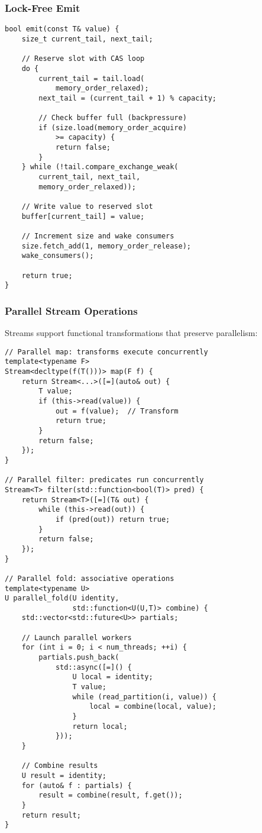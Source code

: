 \documentclass[sigconf,review,anonymous]{acmart}
\begin{document}
\subsubsection{Lock-Free Emit}

\begin{lstlisting}
bool emit(const T& value) {
    size_t current_tail, next_tail;
    
    // Reserve slot with CAS loop
    do {
        current_tail = tail.load(
            memory_order_relaxed);
        next_tail = (current_tail + 1) % capacity;
        
        // Check buffer full (backpressure)
        if (size.load(memory_order_acquire) 
            >= capacity) {
            return false;
        }
    } while (!tail.compare_exchange_weak(
        current_tail, next_tail,
        memory_order_relaxed));
    
    // Write value to reserved slot
    buffer[current_tail] = value;
    
    // Increment size and wake consumers
    size.fetch_add(1, memory_order_release);
    wake_consumers();
    
    return true;
}
\end{lstlisting}

\subsubsection{Parallel Stream Operations}

Streams support functional transformations that preserve parallelism:

\begin{lstlisting}
// Parallel map: transforms execute concurrently
template<typename F>
Stream<decltype(f(T()))> map(F f) {
    return Stream<...>([=](auto& out) {
        T value;
        if (this->read(value)) {
            out = f(value);  // Transform
            return true;
        }
        return false;
    });
}

// Parallel filter: predicates run concurrently
Stream<T> filter(std::function<bool(T)> pred) {
    return Stream<T>([=](T& out) {
        while (this->read(out)) {
            if (pred(out)) return true;
        }
        return false;
    });
}

// Parallel fold: associative operations
template<typename U>
U parallel_fold(U identity, 
                std::function<U(U,T)> combine) {
    std::vector<std::future<U>> partials;
    
    // Launch parallel workers
    for (int i = 0; i < num_threads; ++i) {
        partials.push_back(
            std::async([=]() {
                U local = identity;
                T value;
                while (read_partition(i, value)) {
                    local = combine(local, value);
                }
                return local;
            }));
    }
    
    // Combine results
    U result = identity;
    for (auto& f : partials) {
        result = combine(result, f.get());
    }
    return result;
}
\end{lstlisting}
\end{document}
